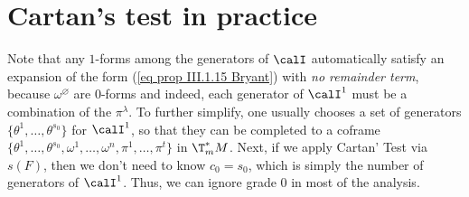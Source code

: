 \section{Cartan's test in practice}



Note that any $1$-forms among the generators of $\calI$  automatically satisfy an expansion of the form (\ref{eq prop III.1.15 Bryant}) with \emph{no remainder term}, because $\omega^{\varnothing}$ are $0$-forms and indeed, each generator of $\calI^1$ must be a combination of the $\pi^\lambda$. To further simplify, one usually chooses a set of generators $\{\theta^1,\ldots,\theta^{s_0}\}$ for $\calI^1$, so that they can be completed to a coframe $\{\theta^1,\ldots,\theta^{s_0},\omega^1,\ldots,\omega^n,\pi^1,\ldots,\pi^t\}$ in $\T^\ast_m M$. Next, if we apply Cartan' Test via $s(F)$, then we don't need to know $c_0=s_0$, which is simply the number of generators of $\calI^1$. Thus, we can ignore grade $0$ in most of the analysis. 

